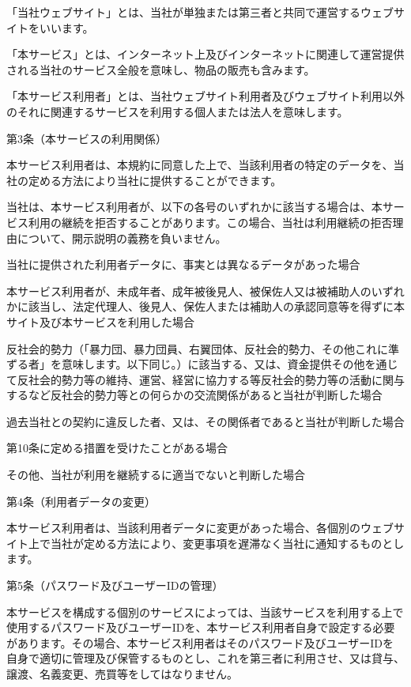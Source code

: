     「当社ウェブサイト」とは、当社が単独または第三者と共同で運営するウェブサイトをいいます。

    「本サービス」とは、インターネット上及びインターネットに関連して運営提供される当社のサービス全般を意味し、物品の販売も含みます。

    「本サービス利用者」とは、当社ウェブサイト利用者及びウェブサイト利用以外のそれに関連するサービスを利用する個人または法人を意味します。

第3条（本サービスの利用関係）

    本サービス利用者は、本規約に同意した上で、当該利用者の特定のデータを、当社の定める方法により当社に提供することができます。

    当社は、本サービス利用者が、以下の各号のいずれかに該当する場合は、本サービス利用の継続を拒否することがあります。この場合、当社は利用継続の拒否理由について、開示説明の義務を負いません。

        当社に提供された利用者データに、事実とは異なるデータがあった場合

        本サービス利用者が、未成年者、成年被後見人、被保佐人又は被補助人のいずれかに該当し、法定代理人、後見人、保佐人または補助人の承認同意等を得ずに本サイト及び本サービスを利用した場合

        反社会的勢力（「暴力団、暴力団員、右翼団体、反社会的勢力、その他これに準ずる者」を意味します。以下同じ。）に該当する、又は、資金提供その他を通じて反社会的勢力等の維持、運営、経営に協力する等反社会的勢力等の活動に関与するなど反社会的勢力等との何らかの交流関係があると当社が判断した場合

        過去当社との契約に違反した者、又は、その関係者であると当社が判断した場合

        第10条に定める措置を受けたことがある場合

        その他、当社が利用を継続するに適当でないと判断した場合

第4条（利用者データの変更）

    本サービス利用者は、当該利用者データに変更があった場合、各個別のウェブサイト上で当社が定める方法により、変更事項を遅滞なく当社に通知するものとします。

第5条（パスワード及びユーザーIDの管理）

    本サービスを構成する個別のサービスによっては、当該サービスを利用する上で使用するパスワード及びユーザーIDを、本サービス利用者自身で設定する必要があります。その場合、本サービス利用者はそのパスワード及びユーザーIDを自身で適切に管理及び保管するものとし、これを第三者に利用させ、又は貸与、譲渡、名義変更、売買等をしてはなりません。


